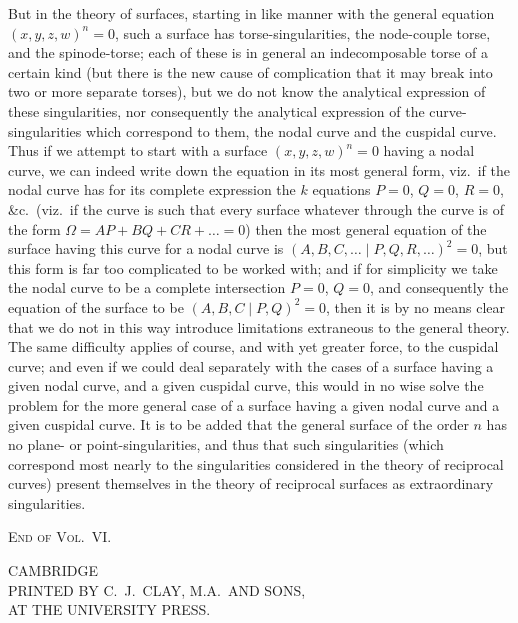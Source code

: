 \documentclass[11pt,a4paper]{article}
\theoremstyle{plain}
\theoremstyle{definition}
\theoremstyle{remark}
\begin{document}
But in the theory of surfaces, starting in like manner with the general equation $(x,y,z,w)^n=0$, such a surface has torse-singularities, the node-couple torse, and the spinode-torse; each of these is in general an indecomposable torse of a certain kind (but there is the new cause of complication that it may break into two or more separate torses), but we do not know the analytical expression of these singularities, nor consequently the analytical expression of the curve-singularities which correspond to them, the nodal curve and the cuspidal curve. Thus if we attempt to start with a surface $(x,y,z,w)^n=0$ having a nodal curve, we can indeed write down the equation in its most general form, viz.\ if the nodal curve has for its complete expression the $k$ equations $P=0$, $Q=0$, $R=0$, \&c.\ (viz.\ if the curve is such that every surface whatever through the curve is of the form $\Omega=AP+BQ+CR+\ldots=0$) then the most general equation of the surface having this curve for a nodal curve is $(A,B,C,\ldots\mid P,Q,R,\ldots)^2=0$, but this form is far too complicated to be worked with; and if for simplicity we take the nodal curve to be a complete intersection $P=0$, $Q=0$, and consequently the equation of the surface to be $(A,B,C\mid P,Q)^2=0$, then it is by no means clear that we do not in this way introduce limitations extraneous to the general theory. The same difficulty applies of course, and with yet greater force, to the cuspidal curve; and even if we could deal separately with the cases of a surface having a given nodal curve, and a given cuspidal curve, this would in no wise solve the problem for the more general case of a surface having a given nodal curve and a given cuspidal curve. It is to be added that the general surface of the order $n$ has no plane- or point-singularities, and thus that such singularities (which correspond most nearly to the singularities considered in the theory of reciprocal curves) present themselves in the theory of reciprocal surfaces as extraordinary singularities.

\begin{flushright}
\textsc{End of Vol.~VI.}
\end{flushright}

\newpage
\setcounter{page}{630}

\begin{center}
\large CAMBRIDGE\\[6pt]
\normalsize PRINTED BY C.\ J.\ CLAY, M.A.\ AND SONS,\\
AT THE UNIVERSITY PRESS.
\end{center}
\end{document}
